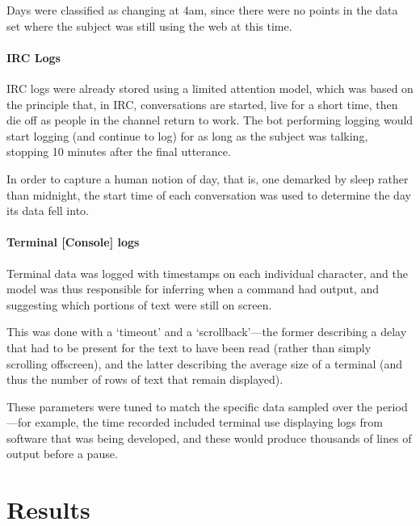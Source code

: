 Days were classified as changing at 4am, since there were no points in the data set where the subject was still using the web at this time.



\paragraph{IRC Logs}
IRC logs were already stored using a limited attention model, which was based on the principle that, in IRC, conversations are started, live for a short time, then die off as people in the channel return to work.  The bot performing logging would start logging (and continue to log) for as long as the subject was talking, stopping 10 minutes after the final utterance.

In order to capture a human notion of day, that is, one demarked by sleep rather than midnight, the start time of each conversation was used to determine the day its data fell into.



\paragraph{Terminal [Console] logs}
Terminal data was logged with timestamps on each individual character, and the model was thus responsible for inferring when a command had output, and suggesting which portions of text were still on screen.

This was done with a `timeout' and a `scrollback'---the former describing a delay that had to be present for the text to have been read (rather than simply scrolling offscreen), and the latter describing the average size of a terminal (and thus the number of rows of text that remain displayed).

These parameters were tuned to match the specific data sampled over the period---for example, the time recorded included terminal use displaying logs from software that was being developed, and these would produce thousands of lines of output before a pause.








\section{Results}

